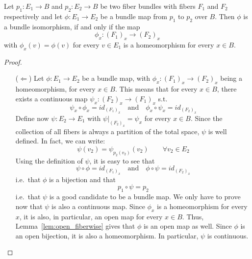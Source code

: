 \begin{proposition}
Let $p_1:E_1\to B$ and $p_2:E_2\to B$ be two fiber bundles with fibers $F_1$ and $F_2$ respectively and let $\phi:E_1\to E_2$ be a bundle map from $p_1$ to $p_2$ over $B$. Then $\phi$ is a bundle isomorphism, if and only if the map
\[\phi_x:{\left(F_1\right)}_x\to{\left(F_2\right)}_x\]
with $\phi_x(v)=\phi(v)$ for every $v\in E_1$ is a homeomorphism for every $x\in B$.
\end{proposition}
\begin{proof}
\begin{itemize}
\item[($\Leftarrow$)] Let $\phi:E_1\to E_2$ be a bundle map, with $\phi_x:{(F_1)}_x\to{(F_2)}_x$ being a homeomorphism, for every $x\in B$. This means that for every $x\in B$,  there exists a continuous map $\psi_x:{(F_2)}_x\to{(F_1)}_x$ s.t.
\[\psi_x\circ\phi_x=id_{{(F_1)}_x}\quad\text{and}\quad\phi_x\circ\psi_x=id_{{(F_2)}_x}\]
Define now $\psi:E_2\to E_1$ with $\left.\psi\right|_{{(F_2)}_x}=\psi_x$ for every $x\in B$. Since the collection of all fibers is always a partition of the total space, $\psi$ is well defined. In fact, we can write:
\[\psi(v_2)=\psi_{p_2(v_2)}(v_2)\qquad\forall v_2\in E_2\]
Using the definition of $\psi$, it is easy to see that
\[\psi\circ\phi=id_{{(F_1)}_x}\quad\text{and}\quad\phi\circ\psi=id_{{(F_2)}_x}\]
i.e.\ that $\phi$ is a bijection and that
\[p_1\circ\psi=p_2\]
i.e.\ that $\psi$ is a good candidate to be a bundle map. We only have to prove now that $\psi$ is also a continuous map. Since $\phi_x$ is a homeomorphism for every $x$, it is also, in particular, an open map for every $x\in B$. Thus, Lemma~\ref{lem:open_fiberwise} gives that $\phi$ is an open map as well. Since $\phi$ is an open bijection, it is also a homeomorphism. In particular, $\psi$ is continuous.
\end{itemize}
\end{proof}
%

